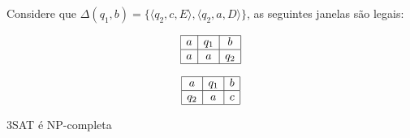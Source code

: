 \begin{example}
  \label{ex:janela}
  Considere que $\Delta(q_1, b) = \{\langle q_2, c, E\rangle, \langle q_2, a, D \rangle\}$, as seguintes janelas são legais:

  \begin{displaymath}
    \begin{array}{|c|c|c|}
      \hline
      a & q_1 & b \\
      \hline
      a & a & q_2 \\
      \hline
    \end{array}
  \end{displaymath}

    \begin{displaymath}
    \begin{array}{|c|c|c|}
      \hline
      a & q_1 & b \\
      \hline
      q_2 & a & c \\
      \hline
    \end{array}
  \end{displaymath}

\end{example}
  
\begin{corollary}
  3SAT é NP-completa
\end{corollary}


